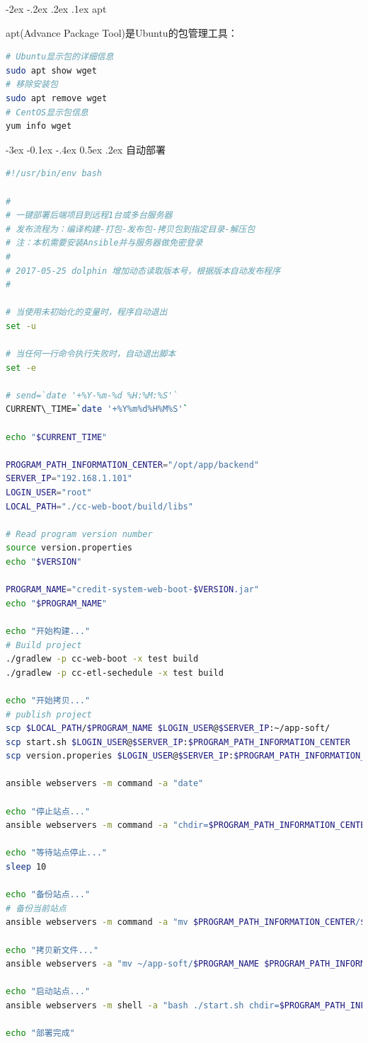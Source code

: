 \documentclass[11pt,fleqn]{book}
\makeatletter
\numberwithin{dummy}{section}
\theoremstyle{ocrenumbox}
\theoremstyle{blacknumex}
\theoremstyle{blacknumbox}
\theoremstyle{ocrenum}
\renewcommand{\subsection}{\@startsection {subsection}{2}{\z@}
	{-3ex \@plus -0.1ex \@minus -.4ex}
	{0.5ex \@plus.2ex }
	{\normalfont\sffamily\bfseries}}
\renewcommand\paragraph{\@startsection{paragraph}{4}{\z@}
	{-2ex \@plus-.2ex \@minus .2ex}
	{.1ex}
	{\normalfont\small\sffamily\bfseries}}
\makeatother
\begin{document}
\paragraph{apt}

apt(Advance Package Tool)是Ubuntu的包管理工具：

\begin{lstlisting}[language=Bash]
# Ubuntu显示包的详细信息
sudo apt show wget
# 移除安装包
sudo apt remove wget
# CentOS显示包信息
yum info wget
\end{lstlisting}

\subsection{自动部署}

\begin{lstlisting}[language=Bash]
#!/usr/bin/env bash

#
# 一键部署后端项目到远程1台或多台服务器
# 发布流程为：编译构建-打包-发布包-拷贝包到指定目录-解压包
# 注：本机需要安装Ansible并与服务器做免密登录
#
# 2017-05-25 dolphin 增加动态读取版本号，根据版本自动发布程序
#

# 当使用未初始化的变量时，程序自动退出
set -u

# 当任何一行命令执行失败时，自动退出脚本
set -e

# send=`date '+%Y-%m-%d %H:%M:%S'`
CURRENT\_TIME=`date '+%Y%m%d%H%M%S'`

echo "$CURRENT_TIME"

PROGRAM_PATH_INFORMATION_CENTER="/opt/app/backend"
SERVER_IP="192.168.1.101"
LOGIN_USER="root"
LOCAL_PATH="./cc-web-boot/build/libs"

# Read program version number
source version.properties
echo "$VERSION"

PROGRAM_NAME="credit-system-web-boot-$VERSION.jar"
echo "$PROGRAM_NAME"

echo "开始构建..."
# Build project
./gradlew -p cc-web-boot -x test build
./gradlew -p cc-etl-sechedule -x test build

echo "开始拷贝..."
# publish project
scp $LOCAL_PATH/$PROGRAM_NAME $LOGIN_USER@$SERVER_IP:~/app-soft/
scp start.sh $LOGIN_USER@$SERVER_IP:$PROGRAM_PATH_INFORMATION_CENTER
scp version.properies $LOGIN_USER@$SERVER_IP:$PROGRAM_PATH_INFORMATION_CENTER

ansible webservers -m command -a "date"

echo "停止站点..."
ansible webservers -m command -a "chdir=$PROGRAM_PATH_INFORMATION_CENTER bash ./stop.sh"

echo "等待站点停止..."
sleep 10

echo "备份站点..."
# 备份当前站点
ansible webservers -m command -a "mv $PROGRAM_PATH_INFORMATION_CENTER/$PROGRAM_NAME $PROGRAM_PATH_INFORMATION_CENTER/$PROGRAM_NAME-$CURRENT_TIME"

echo "拷贝新文件..."
ansible webservers -a "mv ~/app-soft/$PROGRAM_NAME $PROGRAM_PATH_INFORMATION_CENTER"

echo "启动站点..."
ansible webservers -m shell -a "bash ./start.sh chdir=$PROGRAM_PATH_INFORMATION_CENTER"

echo "部署完成"
\end{lstlisting}
\end{document}
